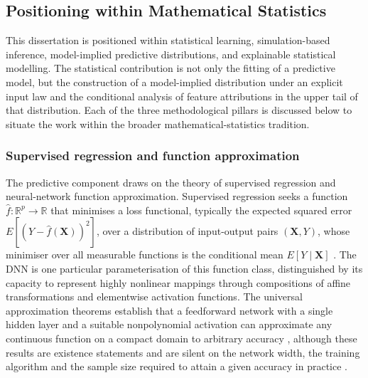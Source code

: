 
\subsection{Positioning within Mathematical Statistics}
\label{sec:positioning}

This dissertation is positioned within statistical learning,
simulation-based inference, model-implied predictive distributions, and
explainable statistical modelling.  The statistical contribution is not
only the fitting of a predictive model, but the construction of a
model-implied distribution under an explicit input law and the
conditional analysis of feature attributions in the upper tail of that
distribution.  Each of the three methodological pillars is discussed
below to situate the work within the broader mathematical-statistics
tradition.

\subsubsection{Supervised regression and function approximation}
\label{sec:supervised_regression_intro}

The predictive component draws on the theory of supervised regression and
neural-network function approximation.  Supervised regression seeks a
function $\hat{f}: \mathbb{R}^p \to \mathbb{R}$ that minimises a loss
functional, typically the expected squared error
$E[(Y - \hat{f}(\mathbf{X}))^2]$, over a distribution of input-output
pairs $(\mathbf{X}, Y)$, whose minimiser over all measurable functions is
the conditional mean $E[Y \mid \mathbf{X}]$
\citep{hastie2009elements, vapnik1998statistical}.  The DNN is one particular
parameterisation of this function class, distinguished by its capacity to
represent highly nonlinear mappings through compositions of affine
transformations and elementwise activation functions.  The universal
approximation theorems establish that a feedforward network with a single
hidden layer and a suitable nonpolynomial activation can approximate any
continuous function on a compact domain to arbitrary accuracy
\citep{cybenko1989approximation, hornik1989multilayer, leshno1993multilayer},
although these results are existence statements and are silent on the
network width, the training algorithm and the sample size required to
attain a given accuracy in practice \citep{goodfellow2016deep}.

